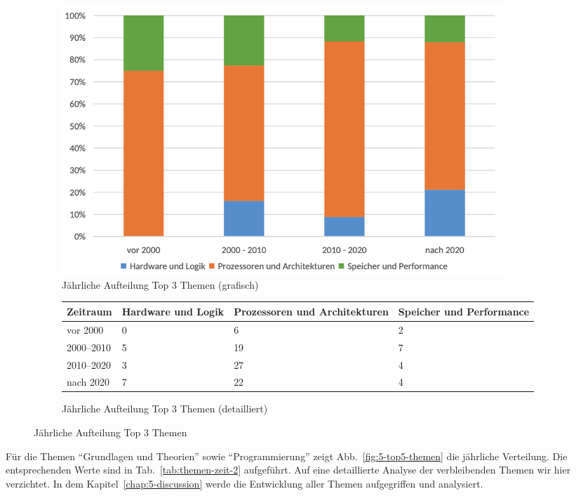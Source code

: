 \begin{figure}[!htbp]
    \centering
    \begin{subfigure}[b]{0.48\textwidth}
        \centering
        \includegraphics[width=0.90\textwidth]{graphics_lit/4-top3-themen-jahr.png}
        \caption{Jährliche Aufteilung Top 3 Themen (grafisch)}
        \label{fig:4-top3-themen}
    \end{subfigure}
    \hfill
    \begin{subfigure}[b]{0.48\textwidth}
        \centering
        \tiny
        \begin{tabularx}{\textwidth}{lXXX}
            \hline
            \textbf{Zeitraum} & \textbf{Hardware und Logik} & \textbf{Prozessoren und Architekturen} & \textbf{Speicher und Performance} \\
            \hline
            vor 2000      & 0  & 6  & 2 \\
            2000--2010    & 5  & 19 & 7 \\
            2010--2020    & 3  & 27 & 4 \\
            nach 2020     & 7  & 22 & 4 \\
            \hline
        \end{tabularx}
        \caption{Jährliche Aufteilung Top 3 Themen (detailliert)}
        \label{tab:themen-zeit}
    \end{subfigure}
    \caption{Jährliche Aufteilung Top 3 Themen}
    \label{fig:pub-typen}
\end{figure}

Für die Themen \enquote{Grundlagen und Theorien} sowie \enquote{Programmierung} zeigt Abb.~\ref{fig:5-top5-themen} die jährliche Verteilung. Die entsprechenden Werte sind in Tab.~\ref{tab:themen-zeit-2} aufgeführt. Auf eine detaillierte Analyse der verbleibenden Themen wir hier verzichtet. In dem Kapitel~\ref{chap:5-discussion} werde die Entwicklung aller Themen aufgegriffen und analysiert.

